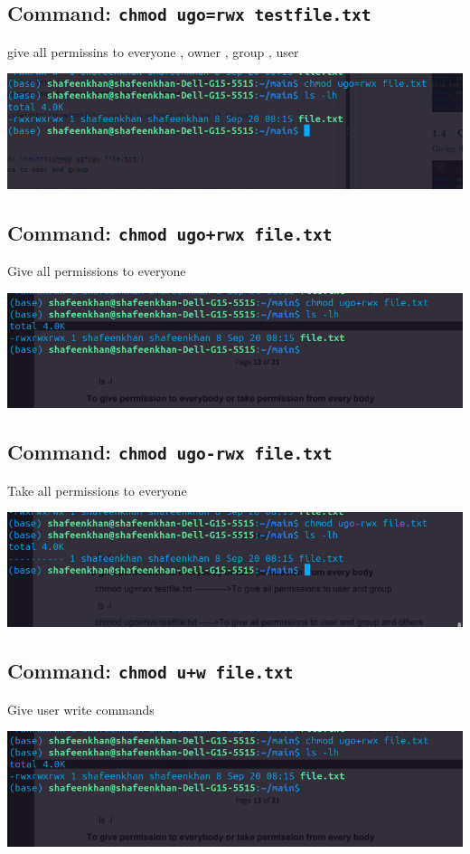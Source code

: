 \documentclass[a4paper,12pt]{article}
\begin{document}
\subsection{Command: \texttt{chmod ugo=rwx testfile.txt}}
give all permissins to everyone , owner , group , user
\begin{center}
    \includegraphics[width=\linewidth]{Screenshot from 2024-09-20 09-16-52.png}
\end{center}

\subsection{Command: \texttt{chmod ugo+rwx file.txt}}
Give all permissions to everyone 
\begin{center}
    \includegraphics[width=\linewidth]{Screenshot from 2024-09-20 09-17-56.png}
\end{center}

\subsection{Command: \texttt{chmod ugo-rwx file.txt}}
Take all permissions to everyone 
\begin{center}
    \includegraphics[width=\linewidth]{Screenshot from 2024-09-20 09-18-13.png}
\end{center}

\subsection{Command: \texttt{chmod u+w file.txt}}
Give user write commands
\begin{center}
    \includegraphics[width=\linewidth]{Screenshot from 2024-09-20 09-17-56.png}
\end{center}
\end{document}
